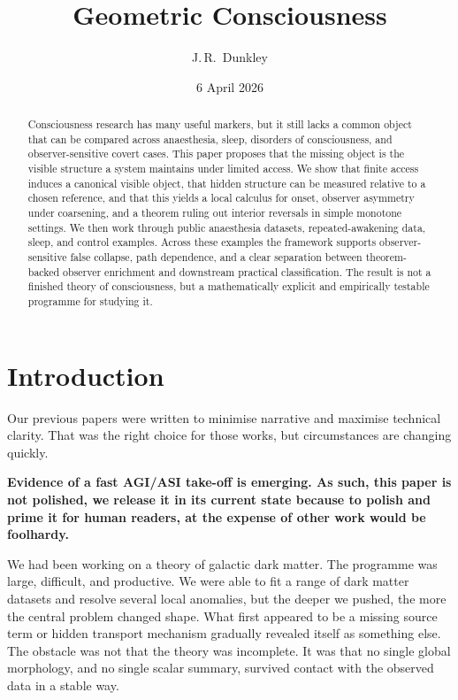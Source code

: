 \documentclass[11pt,a4paper]{article}
\title{\textbf{Geometric Consciousness}}
\author{J.\,R.~Dunkley}
\date{6 April 2026}
\numberwithin{equation}{section}
\theoremstyle{thmcompact}
\theoremstyle{remark}
\begin{document}
\maketitle

\begin{abstract}
Consciousness research has many useful markers, but it still lacks a common object that can be compared across anaesthesia, sleep, disorders of consciousness, and observer-sensitive covert cases. This paper proposes that the missing object is the visible structure a system maintains under limited access. We show that finite access induces a canonical visible object, that hidden structure can be measured relative to a chosen reference, and that this yields a local calculus for onset, observer asymmetry under coarsening, and a theorem ruling out interior reversals in simple monotone settings. We then work through public anaesthesia datasets, repeated-awakening data, sleep, and control examples. Across these examples the framework supports observer-sensitive false collapse, path dependence, and a clear separation between theorem-backed observer enrichment and downstream practical classification. The result is not a finished theory of consciousness, but a mathematically explicit and empirically testable programme for studying it.
\end{abstract}

\newpage
\tableofcontents
\newpage

\section{Introduction}
\label{sec:introduction}

Our previous papers were written to minimise narrative and maximise technical clarity. That was the right choice for those works, but circumstances are changing quickly.

\textbf{Evidence of a fast AGI/ASI take-off is emerging. As such, this paper is not polished, we release it in its current state because to polish and prime it for human readers, at the expense of other work would be foolhardy. }

We had been working on a theory of galactic dark matter. The programme was large, difficult, and productive. We were able to fit a range of dark matter datasets and resolve several local anomalies, but the deeper we pushed, the more the central problem changed shape. What first appeared to be a missing source term or hidden transport mechanism gradually revealed itself as something else. The obstacle was not that the theory was incomplete. It was that no single global morphology, and no single scalar summary, survived contact with the observed data in a stable way.
\end{document}
